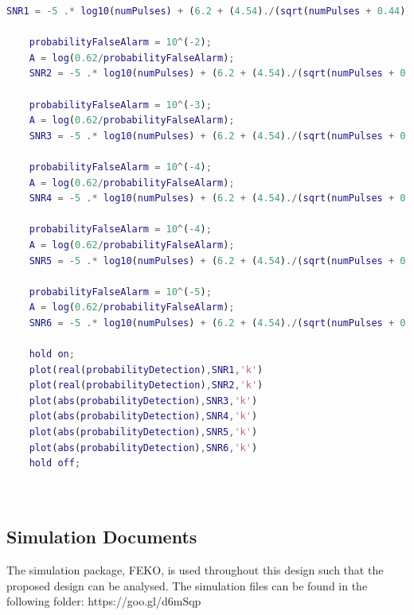 \documentclass[11pt]{witseiepaper}
\begin{document}
\begin{bibunit}[witseie]
\begin{lstlisting}[language=matlab, breaklines=true, postbreak=\mbox{\textcolor{red}{$\hookrightarrow$}\space}]
    SNR1 = -5 .* log10(numPulses) + (6.2 + (4.54)./(sqrt(numPulses + 0.44))) .* log10(A + 0.12 .* A .* B + 1.7 .* B);
    
    probabilityFalseAlarm = 10^(-2);
    A = log(0.62/probabilityFalseAlarm);
    SNR2 = -5 .* log10(numPulses) + (6.2 + (4.54)./(sqrt(numPulses + 0.44))) .* log10(A + 0.12 .* A .* B + 1.7 .* B);
    
    probabilityFalseAlarm = 10^(-3);
    A = log(0.62/probabilityFalseAlarm);
    SNR3 = -5 .* log10(numPulses) + (6.2 + (4.54)./(sqrt(numPulses + 0.44))) .* log10(A + 0.12 .* A .* B + 1.7 .* B);
    
    probabilityFalseAlarm = 10^(-4);
    A = log(0.62/probabilityFalseAlarm);
    SNR4 = -5 .* log10(numPulses) + (6.2 + (4.54)./(sqrt(numPulses + 0.44))) .* log10(A + 0.12 .* A .* B + 1.7 .* B);
    
    probabilityFalseAlarm = 10^(-4);
    A = log(0.62/probabilityFalseAlarm);
    SNR5 = -5 .* log10(numPulses) + (6.2 + (4.54)./(sqrt(numPulses + 0.44))) .* log10(A + 0.12 .* A .* B + 1.7 .* B);
    
    probabilityFalseAlarm = 10^(-5);
    A = log(0.62/probabilityFalseAlarm);
    SNR6 = -5 .* log10(numPulses) + (6.2 + (4.54)./(sqrt(numPulses + 0.44))) .* log10(A + 0.12 .* A .* B + 1.7 .* B);
    
    hold on;
    plot(real(probabilityDetection),SNR1,'k')
    plot(real(probabilityDetection),SNR2,'k')
    plot(abs(probabilityDetection),SNR3,'k')
    plot(abs(probabilityDetection),SNR4,'k')
    plot(abs(probabilityDetection),SNR5,'k')
    plot(abs(probabilityDetection),SNR6,'k')
    hold off;

    
\end{lstlisting}


\subsection{Simulation Documents} \label{sec:SimulationDocuments}
The simulation package, FEKO, is used throughout this design such that the proposed design can be analysed.
The simulation files can be found in the following folder: https://goo.gl/d6mSqp



\putbib[references]
\end{bibunit}
\end{document}
